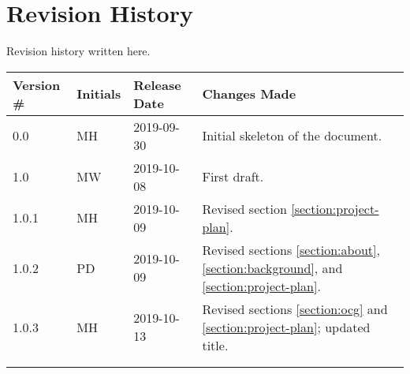\thispagestyle{empty}
\section*{Revision History}

Revision history written here.

\begin{table}[H]
\begin{tabular}{llll}
\hline
Version \# & Initials & Release Date & Changes Made \\ \hline
0.0 & MH & 2019-09-30 & Initial skeleton of the document.\\
1.0 & MW & 2019-10-08 & First draft.\\
1.0.1 & MH & 2019-10-09 & Revised section \ref{section:project-plan}.\\
1.0.2 & PD & 2019-10-09 & Revised sections \ref{section:about}, \ref{section:background}, and \ref{section:project-plan}.\\
1.0.3 & MH & 2019-10-13 & Revised sections \ref{section:ocg} and \ref{section:project-plan}; updated title.\\
 & & & \\
 & & & \\ \hline
\end{tabular}
\end{table}
